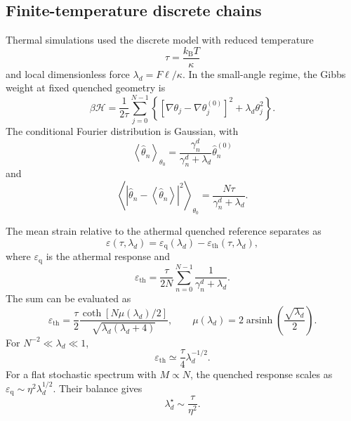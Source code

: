 \documentclass[pdflatex, twocolumn, sn-nature]{sn-jnl}
\begin{document}
\subsection*{Finite-temperature discrete chains}
\label{sec:thermal_methods}

Thermal simulations used the discrete model with reduced temperature
\begin{equation}
\tau=\frac{k_{\mathrm B}T}{\kappa}
\end{equation}
and local dimensionless force $\lambda_d=F\ell/\kappa$. In the small-angle regime, the Gibbs weight at fixed quenched geometry is
\begin{equation}
\beta\mathcal H
=
\frac{1}{2\tau}
\sum_{j=0}^{N-1}
\left\{
\left[
\nabla\theta_j-\nabla\theta_j^{(0)}
\right]^2
+
\lambda_d\theta_j^2
\right\}.
\label{eq:thermal_hamiltonian_methods}
\end{equation}
The conditional Fourier distribution is Gaussian, with
\begin{equation}
\left\langle
\widehat{\theta}_n
\right\rangle_{\theta_0}
=
\frac{\gamma_n^d}
{\gamma_n^d+\lambda_d}
\widehat{\theta}_n^{(0)}
\end{equation}
and
\begin{equation}
\left\langle
\left|
\widehat{\theta}_n
-
\left\langle\widehat{\theta}_n\right\rangle
\right|^2
\right\rangle_{\theta_0}
=
\frac{N\tau}
{\gamma_n^d+\lambda_d}.
\end{equation}

The mean strain relative to the athermal quenched reference separates as
\begin{equation}
\varepsilon(\tau,\lambda_d)
=
\varepsilon_{\mathrm q}(\lambda_d)
-
\varepsilon_{\mathrm{th}}(\tau,\lambda_d),
\end{equation}
where $\varepsilon_{\mathrm q}$ is the athermal response and
\begin{equation}
\varepsilon_{\mathrm{th}}
=
\frac{\tau}{2N}
\sum_{n=0}^{N-1}
\frac{1}
{\gamma_n^d+\lambda_d}.
\end{equation}
The sum can be evaluated as
\begin{equation}
\varepsilon_{\mathrm{th}}
=
\frac{\tau}{2}
\frac{
\coth\left[N\mu(\lambda_d)/2\right]
}
{\sqrt{\lambda_d(\lambda_d+4)}},
\qquad
\mu(\lambda_d)
=
2\operatorname{arsinh}
\left(
\frac{\sqrt{\lambda_d}}{2}
\right).
\label{eq:thermal_exact_methods}
\end{equation}
For $N^{-2}\ll\lambda_d\ll1$,
\begin{equation}
\varepsilon_{\mathrm{th}}
\simeq
\frac{\tau}{4}\lambda_d^{-1/2}.
\end{equation}
For a flat stochastic spectrum with $M\propto N$, the quenched response scales as $\varepsilon_{\mathrm q}\sim\eta^2\lambda_d^{1/2}$. Their balance gives
\begin{equation}
\lambda_d^\star
\sim
\frac{\tau}{\eta^2}.
\end{equation}
\end{document}
